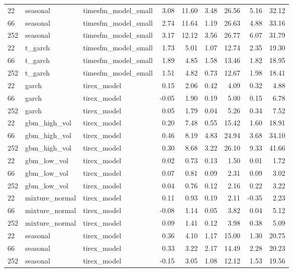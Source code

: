 {\begin{tabular}{lllrrrrrr}
\midrule
22 & seasonal & timesfm\_model\_small & 3.08 & 11.60 & 3.48 & 26.56 & 5.16 & 32.12 \\
66 & seasonal & timesfm\_model\_small & 2.74 & 11.64 & 1.19 & 26.63 & 4.88 & 33.16 \\
252 & seasonal & timesfm\_model\_small & 3.17 & 12.12 & 3.56 & 26.77 & 6.07 & 31.79 \\
\midrule
22 & t\_garch & timesfm\_model\_small & 1.73 & 5.01 & 1.07 & 12.74 & 2.35 & 19.30 \\
66 & t\_garch & timesfm\_model\_small & 1.89 & 4.85 & 1.58 & 13.46 & 1.82 & 18.95 \\
252 & t\_garch & timesfm\_model\_small & 1.51 & 4.82 & 0.73 & 12.67 & 1.98 & 18.41 \\
\midrule
22 & garch & tirex\_model & 0.15 & 2.06 & 0.42 & 4.09 & 0.32 & 4.88 \\
66 & garch & tirex\_model & -0.05 & 1.90 & 0.19 & 5.00 & 0.15 & 6.78 \\
252 & garch & tirex\_model & 0.05 & 1.79 & 0.04 & 5.26 & 0.34 & 7.52 \\
\midrule
22 & gbm\_high\_vol & tirex\_model & 0.20 & 7.48 & 0.55 & 15.42 & 1.60 & 18.91 \\
66 & gbm\_high\_vol & tirex\_model & 0.46 & 8.19 & 4.83 & 24.94 & 3.68 & 34.10 \\
252 & gbm\_high\_vol & tirex\_model & 0.30 & 8.68 & 3.22 & 26.10 & 9.33 & 41.66 \\
\midrule
22 & gbm\_low\_vol & tirex\_model & 0.02 & 0.73 & 0.13 & 1.50 & 0.01 & 1.72 \\
66 & gbm\_low\_vol & tirex\_model & 0.07 & 0.81 & 0.09 & 2.31 & 0.09 & 3.02 \\
252 & gbm\_low\_vol & tirex\_model & 0.04 & 0.76 & 0.12 & 2.16 & 0.22 & 3.22 \\
\midrule
22 & mixture\_normal & tirex\_model & 0.11 & 0.93 & 0.19 & 2.11 & -0.35 & 2.23 \\
66 & mixture\_normal & tirex\_model & -0.08 & 1.14 & 0.05 & 3.82 & 0.04 & 5.12 \\
252 & mixture\_normal & tirex\_model & 0.09 & 1.41 & 0.12 & 3.98 & 0.38 & 5.09 \\
\midrule
22 & seasonal & tirex\_model & 0.36 & 4.10 & 1.17 & 15.00 & 1.30 & 20.75 \\
66 & seasonal & tirex\_model & 0.33 & 3.22 & 2.17 & 14.49 & 2.28 & 20.23 \\
252 & seasonal & tirex\_model & -0.15 & 3.05 & 1.08 & 12.12 & 1.53 & 19.56 \\
\midrule

\end{tabular}}
